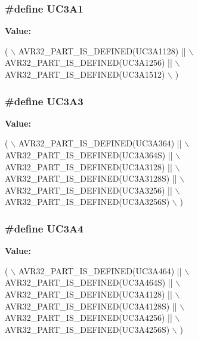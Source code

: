 \subsubsection[{U\+C3\+A1}]{\setlength{\rightskip}{0pt plus 5cm}\#define U\+C3\+A1}\label{group__uc3__part__macros__group_gacbe47eb7ac7d6e655d45657bffab3af6}
{\bfseries Value\+:}
\begin{DoxyCode}
(   \(\backslash\)
        AVR32\_PART\_IS\_DEFINED(UC3A1128) || \(\backslash\)
        AVR32\_PART\_IS\_DEFINED(UC3A1256) || \(\backslash\)
        AVR32\_PART\_IS\_DEFINED(UC3A1512) \(\backslash\)
        )
\end{DoxyCode}
\hypertarget{group__uc3__part__macros__group_gae08aa32db9bd4a60a8cfa222f7ff74cc}{}
\subsubsection[{U\+C3\+A3}]{\setlength{\rightskip}{0pt plus 5cm}\#define U\+C3\+A3}\label{group__uc3__part__macros__group_gae08aa32db9bd4a60a8cfa222f7ff74cc}
{\bfseries Value\+:}
\begin{DoxyCode}
(   \(\backslash\)
        AVR32\_PART\_IS\_DEFINED(UC3A364)   || \(\backslash\)
        AVR32\_PART\_IS\_DEFINED(UC3A364S)  || \(\backslash\)
        AVR32\_PART\_IS\_DEFINED(UC3A3128)  || \(\backslash\)
        AVR32\_PART\_IS\_DEFINED(UC3A3128S) || \(\backslash\)
        AVR32\_PART\_IS\_DEFINED(UC3A3256)  || \(\backslash\)
        AVR32\_PART\_IS\_DEFINED(UC3A3256S) \(\backslash\)
        )
\end{DoxyCode}
\hypertarget{group__uc3__part__macros__group_ga633294c4776386c15ab2050644e77b4f}{}
\subsubsection[{U\+C3\+A4}]{\setlength{\rightskip}{0pt plus 5cm}\#define U\+C3\+A4}\label{group__uc3__part__macros__group_ga633294c4776386c15ab2050644e77b4f}
{\bfseries Value\+:}
\begin{DoxyCode}
(   \(\backslash\)
        AVR32\_PART\_IS\_DEFINED(UC3A464)   || \(\backslash\)
        AVR32\_PART\_IS\_DEFINED(UC3A464S)  || \(\backslash\)
        AVR32\_PART\_IS\_DEFINED(UC3A4128)  || \(\backslash\)
        AVR32\_PART\_IS\_DEFINED(UC3A4128S) || \(\backslash\)
        AVR32\_PART\_IS\_DEFINED(UC3A4256)  || \(\backslash\)
        AVR32\_PART\_IS\_DEFINED(UC3A4256S) \(\backslash\)
        )
\end{DoxyCode}
\hypertarget{group__uc3__part__macros__group_ga61e51606324c212eb11079e5acf592e0}{}
